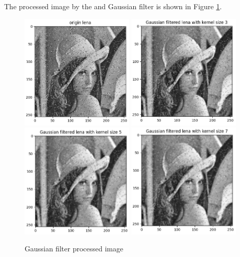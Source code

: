 The processed image by the and Gaussian filter is shown in Figure \ref{fig:p3b}.






\begin{figure}[htbp]
    \centering
	\includegraphics[width=0.48\textwidth]{../images/p3/p3_noisy.png}
	\includegraphics[width=0.48\textwidth]{../images/p3/p3b_3x3.png}
	\includegraphics[width=0.48\textwidth]{../images/p3/p3b_5x5.png}
	\includegraphics[width=0.48\textwidth]{../images/p3/p3b_7x7.png}
    \caption{Gaussian filter processed image}
\label{fig:p3b}
\end{figure}